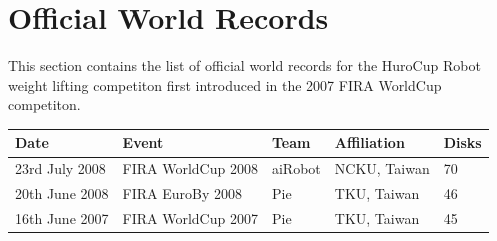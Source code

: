 \documentclass[12pt]{hurocup}
\begin{document}
\section{Official World Records}
\label{sec:worldrecords}

This section contains the list of official world records for the
HuroCup Robot weight lifting competiton first introduced in the 2007
FIRA WorldCup competiton.

\begin{center}
\begin{tabular}{|lllll|}
\hline
Date & Event & Team & Affiliation & Disks \\
\hline
23rd July 2008 & FIRA WorldCup 2008 & aiRobot & NCKU, Taiwan & 70 \\
20th June 2008 & FIRA EuroBy 2008 & Pie      & TKU, Taiwan    & 46  \\
16th June 2007 & FIRA WorldCup 2007 & Pie      & TKU, Taiwan    & 45  \\
\hline
\end{tabular}
\end{center}
\end{document}
